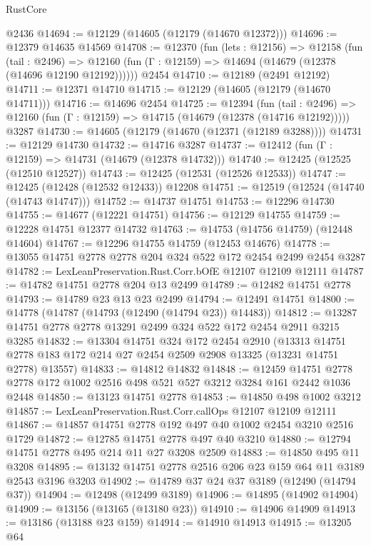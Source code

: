 \begin{lexlean}{RustCore}
\begin{coremodule}
    @2436
@14694 := @12129 (@14605 (@12179 (@14670 @12372)))
@14696 := @12379 @14635 @14569
@14708 := @12370
    (fun (lets : @12156) =>
    @12158
      (fun (tail : @2496) =>
      @12160 (fun (Γ : @12159) => @14694 (@14679 (@12378 (@14696 @12190 @12192))))))
    @2454
@14710 := @12189 (@2491 @12192)
@14711 := @12371 @14710
@14715 := @12129 (@14605 (@12179 (@14670 @14711)))
@14716 := @14696 @2454
@14725 := @12394
    (fun (tail : @2496) => @12160 (fun (Γ : @12159) => @14715 (@14679 (@12378 (@14716 @12192)))))
    @3287
@14730 := @14605 (@12179 (@14670 (@12371 (@12189 @3288))))
@14731 := @12129 @14730
@14732 := @14716 @3287
@14737 := @12412 (fun (Γ : @12159) => @14731 (@14679 (@12378 @14732)))
@14740 := @12425 (@12525 (@12510 @12527))
@14743 := @12425 (@12531 (@12526 @12533))
@14747 := @12425 (@12428 (@12532 @12433)) @12208
@14751 := @12519 (@12524 (@14740 (@14743 @14747)))
@14752 := @14737 @14751
@14753 := @12296 @14730
@14755 := @14677 (@12221 @14751)
@14756 := @12129 @14755
@14759 := @12228 @14751 @12377 @14732
@14763 := @14753 (@14756 @14759) (@12448 @14604)
@14767 := @12296 @14755 @14759 (@12453 @14676)
@14778 := @13055 @14751 @2778 @2778 @204 @324 @522 @172 @2454 @2499 @2454 @3287
@14782 := LexLeanPreservation.Rust.Corr.bOfE @12107 @12109 @12111
@14787 := @14782 @14751 @2778 @204 @13 @2499
@14789 := @12482 @14751 @2778
@14793 := @14789 @23 @13 @23 @2499
@14794 := @12491 @14751
@14800 := @14778 (@14787 (@14793 (@12490 (@14794 @23)) @14483))
@14812 := @13287 @14751 @2778 @2778 @13291 @2499 @324 @522 @172 @2454 @2911 @3215 @3285
@14832 := @13304
    @14751
    @324
    @172
    @2454
    @2910
    (@13313 @14751 @2778 @183 @172 @214 @27 @2454 @2509 @2908 @13325 (@13231 @14751 @2778) @13557)
@14833 := @14812 @14832
@14848 := @12459
    @14751
    @2778
    @2778
    @172
    @1002
    @2516
    @498
    @521
    @527
    @3212
    @3284
    @161
    @2442
    @1036
    @2448
@14850 := @13123 @14751 @2778
@14853 := @14850 @498 @1002 @3212
@14857 := LexLeanPreservation.Rust.Corr.callOps @12107 @12109 @12111
@14867 := @14857 @14751 @2778 @192 @497 @40 @1002 @2454 @3210 @2516 @1729
@14872 := @12785 @14751 @2778 @497 @40 @3210
@14880 := @12794 @14751 @2778 @495 @214 @11 @27 @3208 @2509
@14883 := @14850 @495 @11 @3208
@14895 := @13132 @14751 @2778 @2516 @206 @23 @159 @64 @11 @3189 @2543 @3196 @3203
@14902 := @14789 @37 @24 @37 @3189 (@12490 (@14794 @37))
@14904 := @12498 (@12499 @3189)
@14906 := @14895 (@14902 @14904)
@14909 := @13156 (@13165 (@13180 @23))
@14910 := @14906 @14909
@14913 := @13186 (@13188 @23 @159)
@14914 := @14910 @14913
@14915 := @13205 @64

\end{coremodule}
\end{lexlean}

